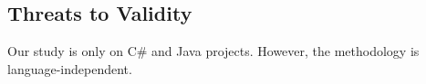 \subsection{Threats to Validity}
\label{threats:sec}

Our study is only on C\# and Java projects. However, the methodology
is language-independent. 
